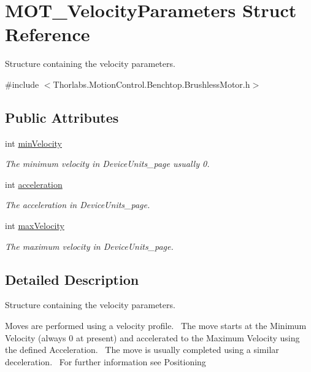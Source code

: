 \hypertarget{struct_m_o_t___velocity_parameters}{}\section{M\+O\+T\+\_\+\+Velocity\+Parameters Struct Reference}
\label{struct_m_o_t___velocity_parameters}


Structure containing the velocity parameters.  




{\ttfamily \#include $<$Thorlabs.\+Motion\+Control.\+Benchtop.\+Brushless\+Motor.\+h$>$}

\subsection*{Public Attributes}
\begin{DoxyCompactItemize}
\item 
int \hyperlink{struct_m_o_t___velocity_parameters_af74f2509960f744e7795bf052e50f783}{min\+Velocity}
\begin{DoxyCompactList}\small\item\em The minimum velocity in Device\+Units\+\_\+page usually 0. \end{DoxyCompactList}\item 
int \hyperlink{struct_m_o_t___velocity_parameters_a0aed3b217348ddbe699e07b17de85885}{acceleration}
\begin{DoxyCompactList}\small\item\em The acceleration in Device\+Units\+\_\+page. \end{DoxyCompactList}\item 
int \hyperlink{struct_m_o_t___velocity_parameters_ade7ffd47f4ab85179a3155c989177da4}{max\+Velocity}
\begin{DoxyCompactList}\small\item\em The maximum velocity in Device\+Units\+\_\+page. \end{DoxyCompactList}\end{DoxyCompactItemize}


\subsection{Detailed Description}
Structure containing the velocity parameters. 

Moves are performed using a velocity profile.~\newline
 The move starts at the Minimum Velocity (always 0 at present) and accelerated to the Maximum Velocity using the defined Acceleration.~\newline
 The move is usually completed using a similar deceleration.~\newline
 For further information see Positioning 

